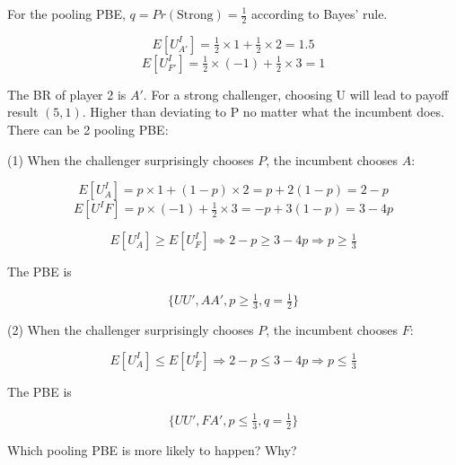\documentclass{article}
\begin{document}
For the pooling PBE, $q=Pr(\text{Strong})= \tfrac12$ according to Bayes' rule.

$$E[U^I_{A'}] = \tfrac12 \times 1+ \tfrac12 \times 2 =1.5$$
$$E[U^I_{F'}] = \tfrac12  \times (-1)+ \tfrac12 \times 3 = 1 $$

The BR of player 2 is $A'$. For a strong challenger, choosing U will lead to payoff result $(5,1)$. Higher than deviating to P no matter what the incumbent does. There can be 2 pooling PBE:

\medskip

(1) When the challenger surprisingly chooses $P$, the incumbent chooses $A$:

$$E[U^I_{A}] = p \times 1+ (1-p)\times 2 = p + 2(1-p) = 2 - p$$
$$E[U^I{F}] = p \times (-1)+ \tfrac12 \times 3 = -p + 3(1-p) = 3 - 4p$$

$$E[U^I_{A}] \ge E[U^I_{F}] \Rightarrow 2-p \ge 3-4p \Rightarrow p \ge \tfrac13$$

The PBE is

$$\{UU',AA',p \ge \tfrac13, q=\tfrac12\}$$

\medskip

(2) When the challenger surprisingly chooses $P$, the incumbent chooses $F$:

$$E[U^I_{A}] \le E[U^I_{F}] \Rightarrow 2-p \le 3-4p \Rightarrow p \le \tfrac13$$

The PBE is

$$\{UU',FA',p \le \tfrac13, q=\tfrac12\}$$

\begin{mdframed}[backgroundcolor=blue!20,linecolor=white]
Which pooling PBE is more likely to happen? Why?
\end{mdframed}
\end{document}
